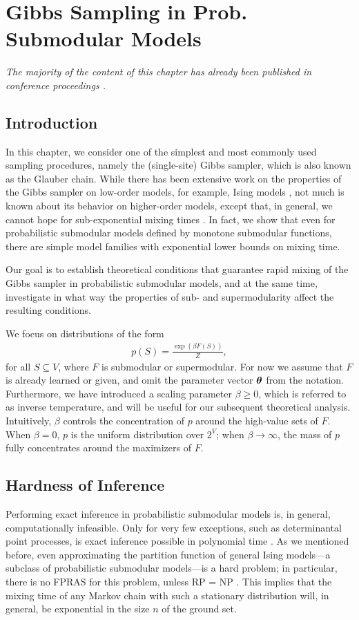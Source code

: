 \chapter{Gibbs Sampling in Prob. Submodular Models} \label{ch:gibbs}

\emph{The majority of the content of this chapter has already been published in conference proceedings \citep{gotovos15}.}

\section{Introduction}
In this chapter, we consider one of the simplest and most commonly used sampling procedures, namely the (single-site) Gibbs sampler, which is also known as the Glauber chain.
While there has been extensive work on the properties of the Gibbs sampler on low-order models, for example, Ising models \citep[Ch. 15]{levin08book}, not much is known about its behavior on higher-order models, except that, in general, we cannot hope for sub-exponential mixing times \citep{jerrum93}.
In fact, we show that even for probabilistic submodular models defined by monotone submodular functions, there are simple model families with exponential lower bounds on mixing time.

Our goal is to establish theoretical conditions that guarantee rapid mixing of the Gibbs sampler in probabilistic submodular models, and at the same time, investigate in what way the properties of sub- and supermodularity affect the resulting conditions.

We focus on distributions of the form
\begin{align}\label{eq:gibbs_pdef}
p(S) = \frac{\exp(\beta F(S))}{Z},
\end{align}
for all $S \subseteq V$, where $F$ is submodular or supermodular.
For now we assume that $F$ is already learned or given, and omit the parameter vector $\bm{\theta}$ from the notation.
Furthermore, we have introduced a scaling parameter $\beta \geq 0$, which is referred to as inverse temperature, and will be useful for our subsequent theoretical analysis.
Intuitively, $\beta$ controls the concentration of $p$ around the high-value sets of $F$.
When $\beta = 0$, $p$ is the uniform distribution over $2^V$; when $\beta \to \infty$, the mass of $p$ fully concentrates around the maximizers of $F$.

\section{Hardness of Inference}
Performing exact inference in probabilistic submodular models is, in general, computationally infeasible.
Only for very few exceptions, such as determinantal point processes, is exact inference possible in polynomial time \citep{kulesza12}.
As we mentioned before, even approximating the partition function of general Ising models---a subclass of probabilistic submodular models---is a hard problem; in particular, there is no FPRAS for this problem, unless RP = NP \citep{jerrum93}.
This implies that the mixing time of any Markov chain with such a stationary distribution will, in general, be exponential in the size $n$ of the ground set.


